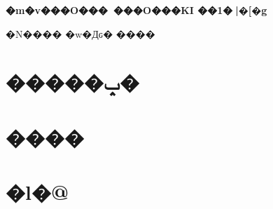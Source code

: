\documentclass{jarticle}
\renewcommand{\today}{\number\year �N\number\month ��\number\day ��}
\begin{document}

\begin{center} 
{\large \bf �m�\�v���O���~���O���KI ��1�񃌃|�[�g}
\end{center} %

\begin{flushright} 
\today %
\hskip 1mm
�w�Дԍ� %
\hskip 1mm
���� %
\end{flushright} %

\section{�����ݒ�}


\section{����}


\section{�l�@}

\end{document}
